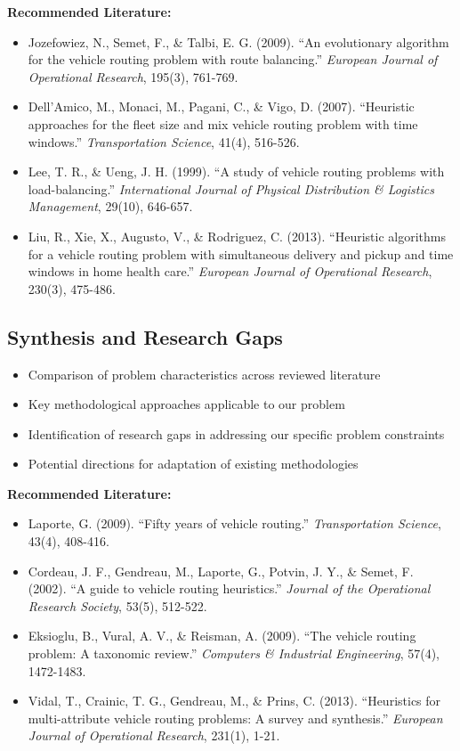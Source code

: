 \noindent\textbf{Recommended Literature:}
\begin{itemize}
    \item Jozefowiez, N., Semet, F., \& Talbi, E. G. (2009). ``An evolutionary algorithm for the vehicle routing problem with route balancing.'' \textit{European Journal of Operational Research}, 195(3), 761-769.
    \item Dell'Amico, M., Monaci, M., Pagani, C., \& Vigo, D. (2007). ``Heuristic approaches for the fleet size and mix vehicle routing problem with time windows.'' \textit{Transportation Science}, 41(4), 516-526.
    \item Lee, T. R., \& Ueng, J. H. (1999). ``A study of vehicle routing problems with load-balancing.'' \textit{International Journal of Physical Distribution \& Logistics Management}, 29(10), 646-657.
    \item Liu, R., Xie, X., Augusto, V., \& Rodriguez, C. (2013). ``Heuristic algorithms for a vehicle routing problem with simultaneous delivery and pickup and time windows in home health care.'' \textit{European Journal of Operational Research}, 230(3), 475-486.
\end{itemize}

\subsection{Synthesis and Research Gaps}
\begin{itemize}
    \item Comparison of problem characteristics across reviewed literature
    \item Key methodological approaches applicable to our problem
    \item Identification of research gaps in addressing our specific problem constraints
    \item Potential directions for adaptation of existing methodologies
\end{itemize}

\noindent\textbf{Recommended Literature:}
\begin{itemize}
    \item Laporte, G. (2009). ``Fifty years of vehicle routing.'' \textit{Transportation Science}, 43(4), 408-416.
    \item Cordeau, J. F., Gendreau, M., Laporte, G., Potvin, J. Y., \& Semet, F. (2002). ``A guide to vehicle routing heuristics.'' \textit{Journal of the Operational Research Society}, 53(5), 512-522.
    \item Eksioglu, B., Vural, A. V., \& Reisman, A. (2009). ``The vehicle routing problem: A taxonomic review.'' \textit{Computers \& Industrial Engineering}, 57(4), 1472-1483.
    \item Vidal, T., Crainic, T. G., Gendreau, M., \& Prins, C. (2013). ``Heuristics for multi-attribute vehicle routing problems: A survey and synthesis.'' \textit{European Journal of Operational Research}, 231(1), 1-21.
\end{itemize}

